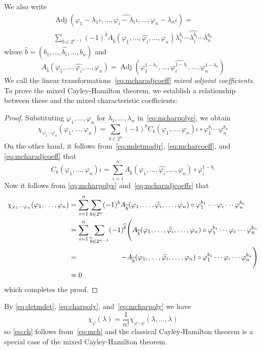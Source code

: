 \documentclass[letterpaper]{article}
\newcommand{\after}{\circ}
\DeclareMathOperator{\Adj}{Adj}
\newcommand{\delete}{\widehat}
\newcommand{\sign}[1]{(-1)^{#1}}
\theoremstyle{definition}
\theoremstyle{plain}
\begin{document}
We also write
\begin{multline}
\Adj(\varphi_1-\lambda_1\iota,\ldots,\delete{\varphi_i-\lambda_i\iota},\ldots,\varphi_n-\lambda_n\iota)=\\
\sum_{\delete{b}\in 2^{n-1}}\sign{\delete{b}}A_{\delete{b}}(\varphi_1,\ldots,\delete{\varphi_i},\ldots,\varphi_n)\lambda_1^{b_1}\cdots\delete{\lambda_i^{b_i}}\cdots\lambda_n^{b_n}\label{eq:mcharadje}
\end{multline}
where \(\delete{b}=(b_1,\ldots,\delete{b_i},\ldots,b_n)\) and
\begin{equation}
A_{\delete{b}}(\varphi_1,\ldots,\delete{\varphi_i},\ldots,\varphi_n)=\Adj(\varphi_1^{1-b_1},\ldots,\delete{\varphi_i^{1-b_i}},\ldots,\varphi_n^{1-b_n})\label{eq:mcharadjcoeff}
\end{equation}
We call the linear transformations~\eqref{eq:mcharadjcoeff} \emph{mixed adjoint coefficients}. To prove the mixed Cayley-Hamilton theorem, we establish a relationship between these and the mixed characteristic coefficients:
\begin{proof}
Substituting \(\varphi_1,\ldots,\varphi_n\) for \(\lambda_1,\ldots,\lambda_n\) in~\eqref{eq:mcharpolye}, we obtain
\begin{equation}
\chi_{\varphi_1\cdots\varphi_n}(\varphi_1,\ldots,\varphi_n)=\sum_{b\in 2^n}\sign{b}C_b(\varphi_1,\ldots,\varphi_n)\iota\after\varphi_1^{b_1}\cdots\varphi_n^{b_n}\label{eq:mcharpolys}
\end{equation}
On the other hand, it follows from~\eqref{eq:mdetmadjr}, \eqref{eq:mcharcoeff}, and \eqref{eq:mcharadjcoeff} that
\begin{equation}
C_b(\varphi_1,\ldots,\varphi_n)\iota=\sum_{i=1}^nA_{\delete{b}}(\varphi_1,\ldots,\delete{\varphi_i},\ldots,\varphi_n)\after\varphi_i^{1-b_i}\label{eq:mcharadjcoeffs}
\end{equation}
Now it follows from \eqref{eq:mcharpolys} and~\eqref{eq:mcharadjcoeffs} that
\begin{align}
\chi_{\varphi_1\cdots\varphi_n}(\varphi_1,\ldots,\varphi_n)&=\sum_{i=1}^n\sum_{b\in 2^n}\sign{b}A_{\delete{b}}(\varphi_1,\ldots,\delete{\varphi_i},\ldots,\varphi_n)\after\varphi_1^{b_1}\cdots\varphi_i\cdots\varphi_n^{b_n}\notag\\
	&=\sum_{i=1}^n\sum_{\delete{b}\in 2^{n-1}}\sign{\delete{b}}\Biggl(A_{\delete{b}}(\varphi_1,\ldots,\delete{\varphi_i},\ldots,\varphi_n)\after\varphi_1^{b_1}\cdots\varphi_i\cdots\varphi_n^{b_n}\notag\\
	&=\qquad\qquad\qquad-A_{\delete{b}}(\varphi_1,\ldots,\delete{\varphi_i},\ldots,\varphi_n)\after\varphi_1^{b_1}\cdots\varphi_i\cdots\varphi_n^{b_n}\Biggr)\notag\\
	&=0
\end{align}
which completes the proof.
\end{proof}
\noindent By \eqref{eq:detmdet}, \eqref{eq:charpoly}, and~\eqref{eq:mcharpoly} we have
\begin{equation}
\chi_{\varphi}(\lambda)=\frac{1}{n!}\chi_{\varphi\cdots\varphi}(\lambda,\ldots,\lambda)
\end{equation}
so \eqref{eq:ch} follows from~\eqref{eq:mch} and the classical Cayley-Hamilton theorem is a special case of the mixed Cayley-Hamilton theorem.
\end{document}
